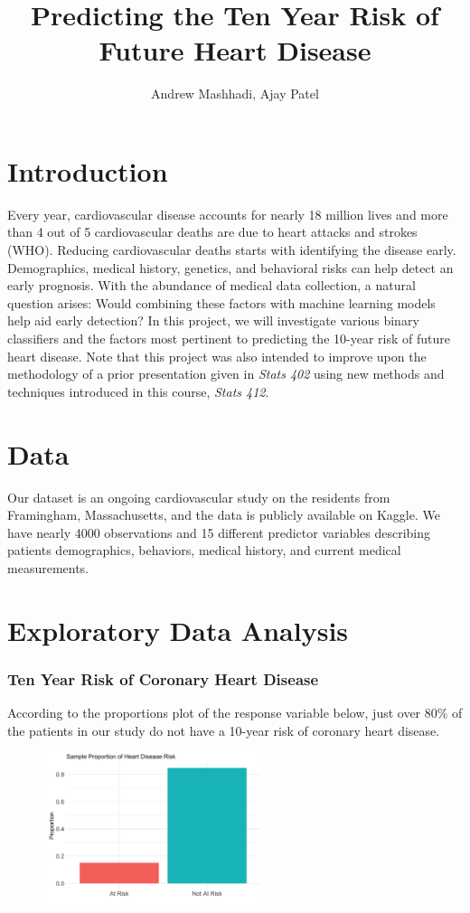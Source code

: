 \documentclass[10pt]{article}
\title{\vspace{-1cm}Predicting the Ten Year Risk of Future Heart Disease}
\author{Andrew Mashhadi, Ajay Patel}
\date{}
\begin{document}
\maketitle

\section*{Introduction}

Every year, cardiovascular disease accounts for nearly 18 million lives and more than 4 out of 5 cardiovascular deaths are due to heart attacks and strokes (WHO). Reducing cardiovascular deaths starts with identifying the disease early. Demographics, medical history, genetics, and behavioral risks can help detect an early prognosis. With the abundance of medical data collection, a natural question arises: Would combining these factors with machine learning models help aid early detection? In this project, we will investigate various binary classifiers and the factors most pertinent to predicting the 10-year risk of future heart disease. Note that this project was also intended to improve upon the methodology of a prior presentation given in \textit{Stats 402} using new methods and techniques introduced in this course, \textit{Stats 412}.

\section*{Data}

Our dataset is an ongoing cardiovascular study on the residents from Framingham, Massachusetts, and the data is publicly available on Kaggle. We have nearly 4000 observations and 15 different predictor variables describing patients demographics, behaviors, medical history, and current medical measurements.

\section*{Exploratory Data Analysis}

\subsubsection*{Ten Year Risk of Coronary Heart Disease}

According to the proportions plot of the response variable below, just over 80\% of the patients in our study do not have a 10-year risk of coronary heart disease. 

\begin{figure}[ht!]
\centering
\includegraphics[height=45mm, width=65mm]{bar_chd.png}
\end{figure}
\end{document}
